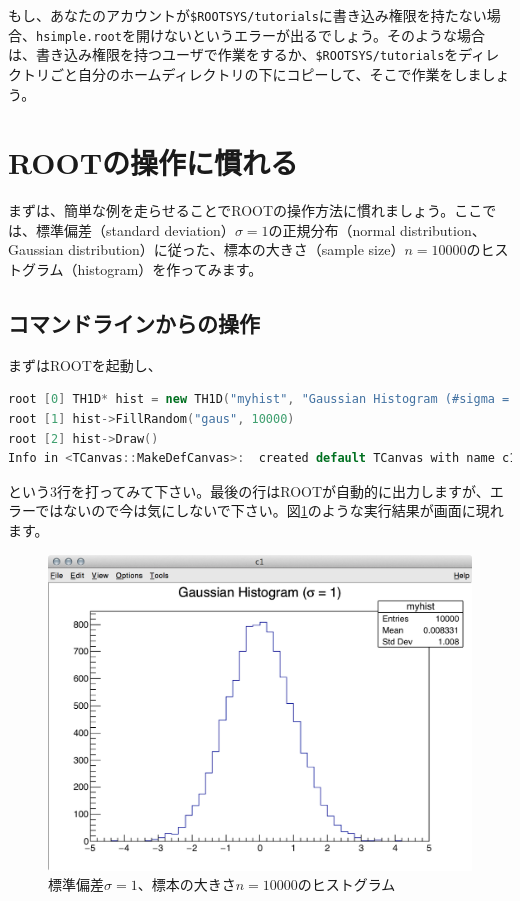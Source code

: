 もし、あなたのアカウントが\texttt{\$ROOTSYS/tutorials}に書き込み権限を持たない場合、\texttt{hsimple.root}を開けないというエラーが出るでしょう。そのような場合は、書き込み権限を持つユーザで作業をするか、\texttt{\$ROOTSYS/tutorials}をディレクトリごと自分のホームディレクトリの下にコピーして、そこで作業をしましょう。

\section{ROOTの操作に慣れる}

まずは、簡単な例を走らせることでROOTの操作方法に慣れましょう。ここでは、標準偏差（standard deviation）$\sigma=1$の正規分布（normal distribution、Gaussian distribution）に従った、標本の大きさ（sample size）$n=10000$のヒストグラム（histogram）を作ってみます。

\subsection{コマンドラインからの操作}
まずはROOTを起動し、
\begin{lstlisting}[language=c++]
root [0] TH1D* hist = new TH1D("myhist", "Gaussian Histogram (#sigma = 1)", 50, -5, 5)
root [1] hist->FillRandom("gaus", 10000)
root [2] hist->Draw()
Info in <TCanvas::MakeDefCanvas>:  created default TCanvas with name c1
\end{lstlisting}
という3行を打ってみて下さい。最後の行はROOTが自動的に出力しますが、エラーではないので今は気にしないで下さい。図\ref{fig_first_script}のような実行結果が画面に現れます。
\begin{figure}
  \centering
  \includegraphics[width=12cm]{fig/first_script.png}
  \caption{標準偏差$\sigma=1$、標本の大きさ$n=10000$のヒストグラム}
  \label{fig_first_script}
\end{figure}


